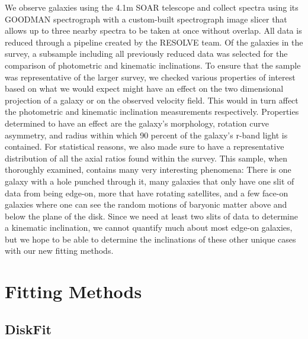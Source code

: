 \documentclass{emulateapj}
\begin{document}
\large We observe galaxies using the 4.1m SOAR telescope and collect spectra using its GOODMAN spectrograph with a custom-built spectrograph image slicer that allows up to three nearby spectra to be taken at once without overlap. All data is reduced through a pipeline created by the RESOLVE team. Of the galaxies in the survey, a subsample including all previously reduced data was selected for the comparison of photometric and kinematic inclinations. To ensure that the sample was representative of the larger survey, we checked various properties of interest based on what we would expect might have an effect on the two dimensional projection of a galaxy or on the observed velocity field. This would in turn affect the photometric and kinematic inclination measurements respectively. Properties determined to have an effect are the galaxy's morphology, rotation curve asymmetry, and radius within which 90 percent of the galaxy's r-band light is contained. For statistical reasons, we also made sure to have a representative distribution of all the axial ratios found within the survey. This sample, when thoroughly examined, contains many very interesting phenomena: There is one galaxy with a hole punched through it, many galaxies that only have one slit of data from being edge-on, more that have rotating satellites, and a few face-on galaxies where one can see the random motions of baryonic matter above and below the plane of the disk. Since we need at least two slits of data to determine a kinematic inclination, we cannot quantify much about most edge-on galaxies, but we hope to be able to determine the inclinations of these other unique cases with our new fitting methods.



\section{Fitting Methods}

\subsection{DiskFit}
\end{document}
